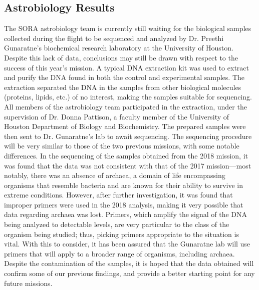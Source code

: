 \subsection{Astrobiology Results}
\label{sec:Astrobiology-Results}

The SORA astrobiology team is currently still waiting for the biological samples collected during the flight to be sequenced and analyzed by Dr. Preethi Gunaratne’s biochemical research laboratory at the University of Houston. Despite this lack of data, conclusions may still be drawn with respect to the success of this year’s mission. A typical DNA extraction kit was used to extract and purify the DNA found in both the control and experimental samples. The extraction separated the DNA in the samples from other biological molecules (proteins, lipids, etc.) of no interest, making the samples suitable for sequencing. All members of the astrobiology team participated in the extraction, under the supervision of Dr. Donna Pattison, a faculty member of the University of Houston Department of Biology and Biochemistry. The prepared samples were then sent to Dr. Gunaratne’s lab to await sequencing. The sequencing procedure will be very similar to those of the two previous missions, with some notable differences. In the sequencing of the samples obtained from the 2018 mission, it was found that the data was not consistent with that of the 2017 mission—most notably, there was an absence of archaea, a domain of life encompassing organisms that resemble bacteria and are known for their ability to survive in extreme conditions. However, after further investigation, it was found that improper primers were used in the 2018 analysis, making it very possible that data regarding archaea was lost. Primers, which amplify the signal of the DNA being analyzed to detectable levels, are very particular to the class of the organism being studied; thus, picking primers appropriate to the situation is vital. With this to consider, it has been assured that the Gunaratne lab will use primers that will apply to a broader range of organisms, including archaea. Despite the contamination of the samples, it is hoped that the data obtained will confirm some of our previous findings, and provide a better starting point for any future missions. 